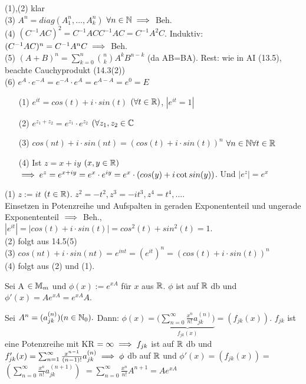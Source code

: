 \documentclass[a4paper,twoside,DIV15,BCOR12mm]{scrbook}
\begin{document}
\begin{beweis}
(1),(2) klar \\
(3) $A^n = diag(A_1^n,...,A_k^n)$ $\forall n \in \mathbb{N} \implies$ Beh. \\
(4) $(C^{-1}AC)^2 = C^{-1}ACC^{-1}AC = C^{-1}A^2C$.  Induktiv: $(C^{-1}AC)^n = C^{-1}A^nC \implies$ Beh. \\
(5) $(A+B)^n = \sum_{k=0}^{n} \binom{n}{k}A^kB^{n-k}$ (da AB=BA). Rest: wie in AI (13.5), beachte Cauchyprodukt (14.3(2)) \\
(6) $e^A\cdot e^{-A} = e^{-A}\cdot e^{A} = e^{A-A} = e^0 = E$
\end{beweis}


\begin{folgerung}
\begin{itemize}
\item[(1)] $e^{it} = cos(t) + i \cdot sin(t)$ $(\forall t \in \mathbb{R})$, $| e^{it} = 1 |$ 
\item[(2)] $e^{z_1 + z_2} = e^{z_1}\cdot e^{z_2}$ $(\forall z_1,z_2 \in \mathbb{C}$ 
\item[(3)] $cos(nt) + i \cdot sin(nt) = (cos(t) + i \cdot sin(t))^n $ $\forall n \in \mathbb{N} \forall t \in \mathbb{R}$ 
\item[(4)] Ist $z = x+ iy$ $(x,y \in \mathbb{R})$ $\implies e^{z} = e^{x+iy} = e^x \cdot e^{iy} = e^x \cdot (cos(y) + i\cot sin(y))$. Und $|e^z|=e^x$
\end{itemize}
\end{folgerung}

\begin{beweis}
(1) $z := it$ $(t \in \mathbb{R})$. $z^2 = -t^2, z^3 = -it^3, z^4=t^4,... .$ \\
Einsetzen in Potenzreihe und Aufspalten in geraden Exponententeil und ungerade Exponententeil $\implies$ Beh., $|e^{it}|= |cos(t)+i\cdot sin(t)| = cos^2(t)+sin^2(t) = 1.$ \\
(2) folgt aus 14.5(5) \\
(3) $cos(nt)+i \cdot sin(nt) = e^{int} = (e^{it})^n = (cos(t) + i\cdot sin(t))^n$ \\
(4) folgt aus (2) und (1).
\end{beweis}

\begin{satz}
Sei A $\in \mathbb{M}_m$ und $\phi(x):=e^{xA}$ für $x$ aus $\mathbb{R}$. $\phi$ ist auf $\mathbb{R}$ db und 
$\phi'(x) = Ae^{xA}=e^{xA}A$.
\end{satz}

\begin{beweis}
Sei $A^n = (a_{jk}^{(n)}) (n\in \mathbb{N}_0). $ Dann: 
$\phi(x) = (\underbrace{\sum_{n=0}^{\infty}\frac{x^n}{n!}a_{jk}^{(n)})}_{f_{jk}(x)} = (f_{jk}(x))$. $f_{jk}$ ist eine Potenzreihe mit KR $=\infty \implies f_{jk}$ ist auf $\mathbb{R}$ db und
$f_{jk}'(x) = \sum_{n=1}^{\infty}\frac{x^{n-1}}{(n-1)!}a_{jk}^{(n)} \implies \phi$ db auf $\mathbb{R}$
und $\phi'(x) = (f_{jk}(x)) = $
$(\sum_{n=0}^{\infty}\frac{x^n}{n!}a_{jk}^{(n+1)})$ 
$ = \sum_{n=0}^{\infty} \frac{x^n}{n!} A^{n+1} = Ae^{xA}$
\end{beweis}
\end{document}
